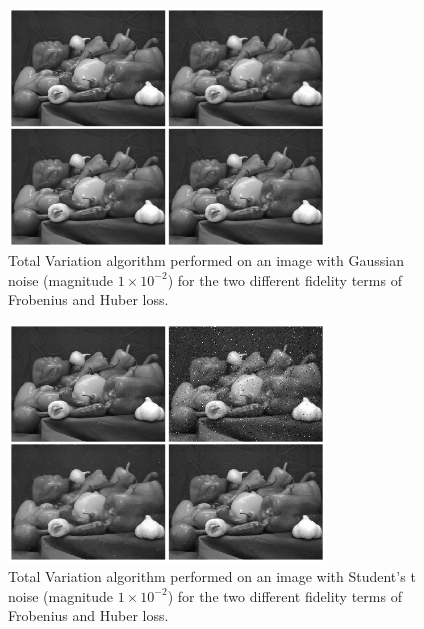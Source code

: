 \documentclass[10pt,a4paper]{article}
\begin{document}
\begin{figure}[H]
\begin{center}
\includegraphics[width = 0.75\textwidth]{../figures/gaussian_peppers.png} 
\end{center}
\caption{Total Variation algorithm performed on an image with Gaussian noise (magnitude $1 \times 10^{-2}$) for the two different fidelity terms of Frobenius and Huber loss.}
\label{tv_gauss}
\end{figure}

\begin{figure}[H]
\begin{center}
\includegraphics[width = 0.75\textwidth]{../figures/student-t_peppers.png} 
\end{center}
\caption{Total Variation algorithm performed on an image with Student's t noise (magnitude $1 \times 10^{-2}$) for the two different fidelity terms of Frobenius and Huber loss.}
\label{tv_student}
\end{figure}
\end{document}
